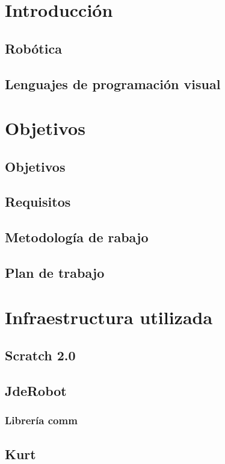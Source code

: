 \documentclass{article}
\begin{document}
\tableofcontents

\vspace{2cm}

\section{Introducción}
    \subsection{Robótica}
    \subsection{Lenguajes de programación visual}
\section{Objetivos}
    \subsection{Objetivos}
    \subsection{Requisitos}
    \subsection{Metodología de rabajo}
    \subsection{Plan de trabajo}
\section{Infraestructura utilizada}
    \subsection{Scratch 2.0}
    \subsection{JdeRobot}
    \subsubsection{Librería comm}
    \subsection{Kurt}
\end{document}
